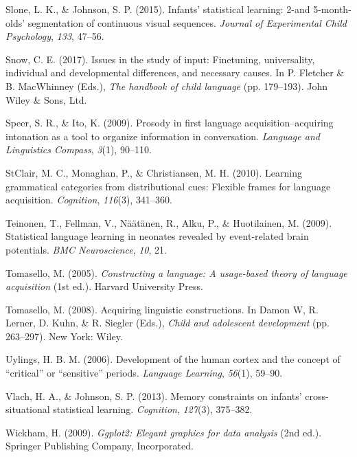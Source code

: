 \documentclass[
  english,
  man,mask,floatsintext]{apa6}
\begin{document}
\leavevmode\hypertarget{ref-slone2015infants}{}%
Slone, L. K., \& Johnson, S. P. (2015). Infants' statistical learning: 2-and 5-month-olds' segmentation of continuous visual sequences. \emph{Journal of Experimental Child Psychology}, \emph{133}, 47--56.

\leavevmode\hypertarget{ref-snow2017issues}{}%
Snow, C. E. (2017). Issues in the study of input: Finetuning, universality, individual and developmental differences, and necessary causes. In P. Fletcher \& B. MacWhinney (Eds.), \emph{The handbook of child language} (pp. 179--193). John Wiley \& Sons, Ltd.

\leavevmode\hypertarget{ref-speer2009prosody}{}%
Speer, S. R., \& Ito, K. (2009). Prosody in first language acquisition--acquiring intonation as a tool to organize information in conversation. \emph{Language and Linguistics Compass}, \emph{3}(1), 90--110.

\leavevmode\hypertarget{ref-clair2010learning}{}%
StClair, M. C., Monaghan, P., \& Christiansen, M. H. (2010). Learning grammatical categories from distributional cues: Flexible frames for language acquisition. \emph{Cognition}, \emph{116}(3), 341--360.

\leavevmode\hypertarget{ref-teinonen2009statistical}{}%
Teinonen, T., Fellman, V., Näätänen, R., Alku, P., \& Huotilainen, M. (2009). Statistical language learning in neonates revealed by event-related brain potentials. \emph{BMC Neuroscience}, \emph{10}, 21.

\leavevmode\hypertarget{ref-tomasello2003constructing}{}%
Tomasello, M. (2005). \emph{Constructing a language: A usage-based theory of language acquisition} (1st ed.). Harvard University Press.

\leavevmode\hypertarget{ref-tomasello2006acquiring}{}%
Tomasello, M. (2008). Acquiring linguistic constructions. In Damon W, R. Lerner, D. Kuhn, \& R. Siegler (Eds.), \emph{Child and adolescent development} (pp. 263--297). New York: Wiley.

\leavevmode\hypertarget{ref-uylings2006development}{}%
Uylings, H. B. M. (2006). Development of the human cortex and the concept of ``critical'' or ``sensitive'' periods. \emph{Language Learning}, \emph{56}(1), 59--90.

\leavevmode\hypertarget{ref-vlach2013memory}{}%
Vlach, H. A., \& Johnson, S. P. (2013). Memory constraints on infants' cross-situational statistical learning. \emph{Cognition}, \emph{127}(3), 375--382.

\leavevmode\hypertarget{ref-ggplot2}{}%
Wickham, H. (2009). \emph{Ggplot2: Elegant graphics for data analysis} (2nd ed.). Springer Publishing Company, Incorporated.
\end{document}
